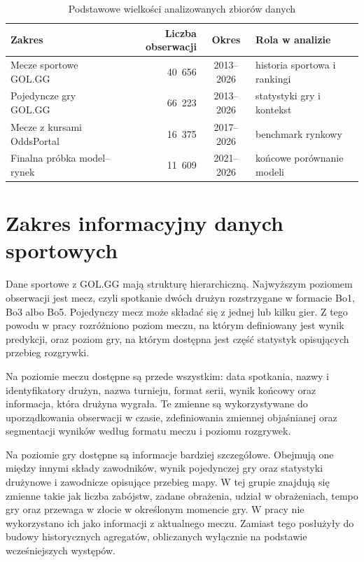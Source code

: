 \begin{table}[H]
    \centering
    \caption{Podstawowe wielkości analizowanych zbiorów danych}
    \label{tab:data_scope_summary}
    \small
    \begin{tabular}{p{5.3cm}r c p{3.2cm}}
        \toprule
        Zakres & Liczba obserwacji & Okres & Rola w analizie \\
        \midrule
        Mecze sportowe GOL.GG & 40~656 & 2013--2026 & historia sportowa i rankingi \\
        Pojedyncze gry GOL.GG & 66~223 & 2013--2026 & statystyki gry i kontekst \\
        Mecze z kursami OddsPortal & 16~375 & 2017--2026 & benchmark rynkowy \\
        Finalna próbka model--rynek & 11~609 & 2021--2026 & końcowe porównanie modeli \\
        \bottomrule
    \end{tabular}
\end{table}

\section{Zakres informacyjny danych sportowych}

Dane sportowe z GOL.GG mają strukturę hierarchiczną. Najwyższym poziomem obserwacji jest mecz, czyli
spotkanie dwóch drużyn rozstrzygane w formacie Bo1, Bo3 albo Bo5. Pojedynczy mecz może składać się z
jednej lub kilku gier. Z tego powodu w pracy rozróżniono poziom meczu, na którym definiowany jest
wynik predykcji, oraz poziom gry, na którym dostępna jest część statystyk opisujących przebieg
rozgrywki.

Na poziomie meczu dostępne są przede wszystkim: data spotkania, nazwy i identyfikatory drużyn, nazwa
turnieju, format serii, wynik końcowy oraz informacja, która drużyna wygrała. Te zmienne są
wykorzystywane do uporządkowania obserwacji w czasie, zdefiniowania zmiennej objaśnianej oraz
segmentacji wyników według formatu meczu i poziomu rozgrywek.

Na poziomie gry dostępne są informacje bardziej szczegółowe. Obejmują one między innymi składy
zawodników, wynik pojedynczej gry oraz statystyki drużynowe i zawodnicze opisujące przebieg mapy. W
tej grupie znajdują się zmienne takie jak liczba zabójstw, zadane obrażenia, udział w obrażeniach,
tempo gry oraz przewaga w złocie w określonym momencie gry. W pracy nie wykorzystano ich jako
informacji z aktualnego meczu. Zamiast tego posłużyły do budowy historycznych agregatów, obliczanych
wyłącznie na podstawie wcześniejszych występów.

